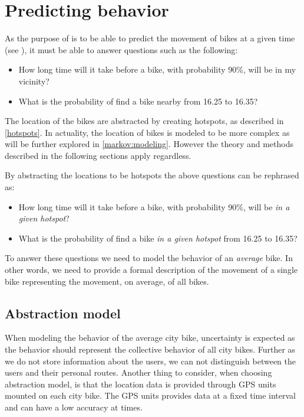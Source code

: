 \section{Predicting behavior}
As the purpose of \projectname{} is to be able to predict the movement of bikes at a given time (see ), it must be able to answer questions such as the following:
\begin{itemize}
\item How long time will it take before a bike, with probability 90\%, will be in my vicinity?
\item What is the probability of find a bike nearby from 16.25 to 16.35?
\end{itemize}

The location of the bikes are abstracted by creating hotspots, as described in \cref{hotspots}.
In actuality, the location of bikes is modeled to be more complex as will be further explored in \cref{markov:modeling}.
However the theory and methods described in the following sections apply regardless.

By abstracting the locations to be hotspots the above questions can be rephrased as:

\begin{itemize}
\item How long time will it take before a bike, with probability 90\%, will be \textit{in a given hotspot}?
\item What is the probability of find a bike \textit{in a given hotspot} from 16.25 to 16.35?
\end{itemize}

To answer these questions we need to model the behavior of an \textit{average} bike.
In other words, we need to provide a formal description of the movement of a single bike representing the movement, on average, of all bikes.

\subsection{Abstraction model}
When modeling the behavior of the average city bike, uncertainty is expected as the behavior should represent the collective behavior of all city bikes.
Further as we do not store information about the users, we can not distinguish between the users and their personal routes.
Another thing to consider, when choosing abstraction model, is that the location data is provided through GPS units mounted on each city bike.
The GPS units provides data at a fixed time interval and can have a low accuracy at times.

